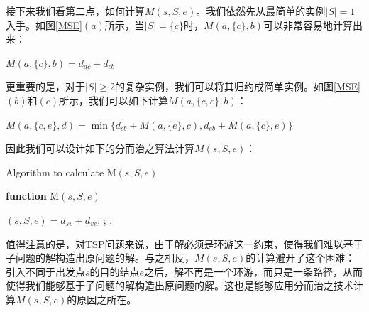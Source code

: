 		
	接下来我们看第二点，如何计算$M(s, S, e)$。我们依然先从最简单的实例$|S|=1$入手。如图\ref{MSE}$(a)$所示，当$|S|=\{c\}$时，$M(a, \{c\}, b)$可以非常容易地计算出来：
	\begin{center}
		$M(a, \{c\}, b) = d_{ac} + d_{cb}$
	\end{center}
	更重要的是，对于$|S|\geq 2$的复杂实例，我们可以将其归约成简单实例。如图\ref{MSE}$(b)$和$(c)$所示，我们可以如下计算$M(a, \{c, e\}, b)$：
	\begin{center}
		$M(a, \{c, e\}, d) = \min\{ d_{cb} + M(a, \{e\}, c), d_{eb} + M(a, \{ c\}, e) \} $
	\end{center}
	因此我们可以设计如下的分而治之算法计算$M(s, S, e)$：\\
\begin{algorithm}[H]
\caption{Algorithm to calculate {\sc M}$(s, S, e)$}\label{TSPMSEAlgo}
{{\bf function} {\sc M}$(s, S, e)$}
\begin{algorithmic}[1]
	$(s, S, e) = d_{sv} + d_{ve}$; 
	; 
\ENDIF
{}; 
\end{algorithmic}
\end{algorithm}
	值得注意的是，对TSP问题来说，由于解必须是环游这一约束，使得我们难以基于子问题的解构造出原问题的解。与之相反，$M(s, S, e)$的计算避开了这个困难：引入不同于出发点$s$的目的结点$e$之后，解不再是一个环游，而只是一条路径，从而使得我们能够基于子问题的解构造出原问题的解。这也是能够应用分而治之技术计算$M(s, S, e)$的原因之所在。

